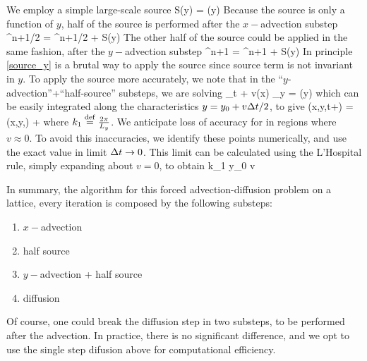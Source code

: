 \documentclass[11pt]{article}
\begin{document}
We employ a simple large-scale source
\beq
S(y) = \cos \left(y\right)\per
\eeq
Because the source is only a function of $y$, half of the source is performed after the $x-$advection
substep
\beq
\label{source_x}
\vth^{n+1/2} = \vth^{n+1/2} +  S(y)\per
\eeq
The other half of the source could be applied in the same fashion, after the $y-$advection
substep
\beq
\label{source_y}
\vth^{n+1} = \vth^{n+1} +  S(y)\per
\eeq
In principle \eqref{source_y} is a brutal way to apply the source since source term is not invariant in $y$.
To apply the source more accurately, we note that in the ``$y$-advection''+``half-source'' substeps, we are
solving
\beq
\vth_t + v(x) \vth_y = \cos \left(y\right)\com
\eeq
which can be easily integrated along the characteristics $y = y_0 + v \Delta t/2$, to give
\beq
\label{adv_source_y}
\vth(x,y,t+\dt) = \vth(x,y,\dt) + \per
\eeq
where $k_1 \stackrel{\mathrm{def}}{=} \frac{2\pi}{L_y}$. We anticipate loss of accuracy for in regions where $v\approx 0$. To
avoid this inaccuracies, we identify these points numerically, and use the exact value in limit $\Delta t \to 0$.
This limit can be calculated using the L'Hospital rule, simply expanding about $v=0$, to obtain
\beq
{} \to {}\cos k_1 y_0 \qquad {}
\qquad v \per
\eeq


In summary, the algorithm for this forced advection-diffusion problem on a lattice, every iteration is
composed by the following substeps:
\begin{enumerate}
    \item $x-$advection
    \item half source
    \item $y-$advection + half source
    \item diffusion
\end{enumerate}
Of course, one could break the diffusion step in two substeps, to be performed after the advection.
In practice, there is no significant difference, and we opt to use the single step difusion above
for computational efficiency. 
\end{document}
